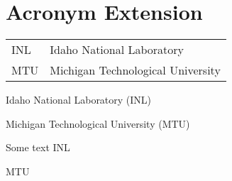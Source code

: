 
\chapter{\label{acronym-extension}Acronym Extension}
\begin{tabulary}{\linewidth}{LL}
INL&Idaho National Laboratory\\MTU&Michigan Technological University\\
\end{tabulary}

\par Idaho National Laboratory (INL)
\par Michigan Technological University (MTU)
\par Some text INL
\par MTU 